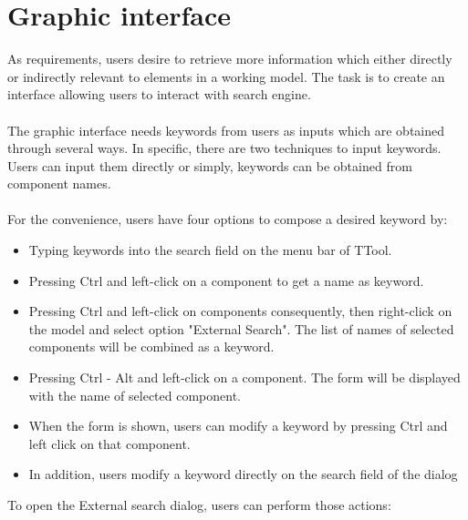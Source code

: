 \documentclass[a4paper,12pt,oneside]{report}
\begin{document}
		\section{Graphic interface}
		As requirements, users desire to retrieve more information which either directly or indirectly relevant to elements in a working model. The task is to create an interface allowing users to interact with search engine.\\\\
		The graphic interface needs keywords from users as inputs which are obtained through several ways. In specific, there are two techniques to input keywords. Users can input them directly or simply, keywords can be obtained from component names.\\\\
		For the convenience, users have four options to compose a desired keyword by:
		\begin{itemize}
			\item Typing keywords into the search field on the menu bar of TTool.
			\item Pressing Ctrl and left-click on a component to get a name as keyword.
			\item Pressing Ctrl and left-click on components consequently, then right-click on the model and select option "External Search". The list of names of selected components will be combined as a keyword.
			\item Pressing Ctrl - Alt and left-click on a component. The form will be displayed with the name of selected component.
			\item When the form is shown, users can modify a keyword by pressing Ctrl and left click on that component. 
			\item In addition, users modify a keyword directly on the search field of the dialog
		\end{itemize}
		To open the External search dialog, users can perform those actions:
\end{document}
